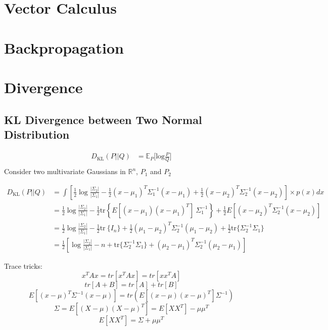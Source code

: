 \renewcommand{\thesection}{\arabic{section}.\arabic{section}}
\setcounter{section}{0}


\begin{appendices}
\chapter{Vector Calculus}


\chapter{Backpropagation}



\chapter{Divergence}
\section{KL Divergence between Two Normal Distribution}
\begin{align*}
D_\text{KL}(P||Q) & = \mathbb{E}_P\Big[\textrm{log}\frac{P}{Q}\Big]\\
\end{align*}
Consider two multivariate Gaussians in $\mathbb{R}^n$, $P_1$ and $P_2$

\begin{align*}
D_\text{KL}(P||Q) &= \int \left[ \frac{1}{2} \log\frac{|\Sigma_2|}{|\Sigma_1|} - \frac{1}{2} (x-\mu_1)^T\Sigma_1^{-1}(x-\mu_1) + \frac{1}{2} (x-\mu_2)^T\Sigma_2^{-1}(x-\mu_2) \right] \times p(x) dx \\
&= \frac{1}{2} \log\frac{|\Sigma_2|}{|\Sigma_1|} - \frac{1}{2} \text{tr} \left\{E[(x - \mu_1)(x - \mu_1)^T] \ \Sigma_1^{-1} \right\} + \frac{1}{2} E[(x - \mu_2)^T \Sigma_2^{-1} (x - \mu_2)] \\
&= \frac{1}{2} \log\frac{|\Sigma_2|}{|\Sigma_1|} - \frac{1}{2} \text{tr}\ \{I_n \} + \frac{1}{2} (\mu_1 - \mu_2)^T \Sigma_2^{-1} (\mu_1 - \mu_2) + \frac{1}{2} \text{tr} \{ \Sigma_2^{-1} \Sigma_1 \} \\
&= \frac{1}{2}\left[\log\frac{|\Sigma_2|}{|\Sigma_1|} - n + \text{tr} \{ \Sigma_2^{-1}\Sigma_1 \} + (\mu_2 - \mu_1)^T \Sigma_2^{-1}(\mu_2 - \mu_1)\right]
\end{align*}

Trace tricks:
$$x^TAx = tr[x^TAx] = tr[xx^TA]$$
$$tr[A+B] = tr[A]+tr[B]$$
$$E[(x-\mu)^T \Sigma^{-1} (x-\mu)]= tr(E[(x-\mu)(x-\mu)^T] \Sigma^{-1})$$
$$\Sigma = E[(X-\mu)(X-\mu)^T]=E[XX^T]-\mu\mu^T$$
$$E[XX^T] = \Sigma + \mu\mu^T$$


\end{appendices}
